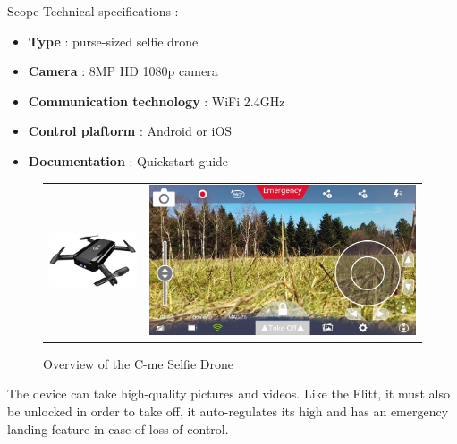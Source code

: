 \begin{chaptercover}{Scope}
Technical specifications :
\begin{itemize}[itemsep=.1cm,topsep=.1cm]
  \item \textbf{Type} : purse-sized selfie drone
  \item \textbf{Camera} : 8MP HD 1080p camera
  \item \textbf{Communication technology} : WiFi 2.4GHz
  \item \textbf{Control plaftorm} : Android or iOS
  \item \textbf{Documentation} : Quickstart guide \cite{cme-selfie-drone}
\end{itemize}

\begin{figure}[H]
  \begin{tabular}{m{5cm}m{12.3cm}}
  \centering
  \includegraphics[width=\linewidth]{figures/cme-selfie-drone} &
  \centering
  \includegraphics[width=0.65\linewidth]{figures/cme-selfie-drone-ui} \\
  \end{tabular}
  \caption{Overview of the C-me Selfie Drone}
  \label{fig:flitt-selfie-cam}
\end{figure}

The device can take high-quality pictures and videos. Like the Flitt, it must also be unlocked in order to take off, it auto-regulates its high and has an emergency landing feature in case of loss of control.


\end{chaptercover}
